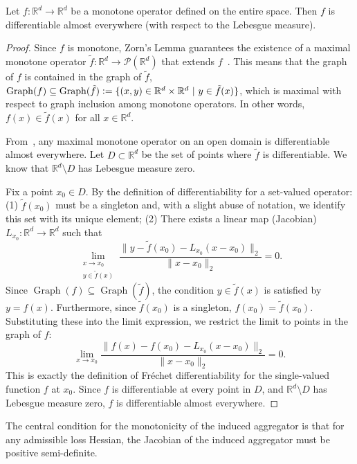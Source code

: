 \documentclass[twoside,11pt]{article}
\newcommand{\R}{\mathbb{R}}
\begin{document}
\begin{theorem}\label{lem:monotone-differentiable}
    Let $f: \mathbb{R}^d \to \mathbb{R}^d$ be a monotone operator defined on the entire space. 
    Then $f$ is differentiable almost everywhere (with respect to the Lebesgue measure).
\end{theorem}
\begin{proof}
    Since $f$ is monotone, Zorn's Lemma guarantees the existence of a maximal monotone operator $\tilde{f}: \mathbb{R}^d \to \mathcal{P}(\mathbb{R}^d)$ that extends $f$~\citep[Theorem 20.21]{Bauschke2011ConvexAA}. 
    This means that the graph of $f$ is contained in the graph of $\tilde{f}$, $\operatorname{Graph}(f) \subseteq \operatorname{Graph}(\tilde{f}) \vcentcolon= \{(x,y) \in \mathbb{R}^d \times \mathbb{R}^d\ |\ y \in \tilde f(x)\}$, which is maximal with respect to graph inclusion among monotone operators.
    In other words, $f(x) \in \tilde{f}(x)$ for all $x\in\R^d$.

    From~\citet[Theorem 3.2]{albamb96}, any maximal monotone operator on an open domain is differentiable almost everywhere. 
    Let $D \subset \mathbb{R}^d$ be the set of points where $\tilde{f}$ is differentiable. 
    We know that $\mathbb{R}^d \setminus D$ has Lebesgue measure zero.

    Fix a point $x_0 \in D$. By the definition of differentiability for a set-valued operator:
    (1) $\tilde{f}(x_0)$ must be a singleton and, with a slight abuse of notation, we identify this set with its unique element;
    (2) There exists a linear map (Jacobian) $L_{x_0}: \mathbb{R}^d \to \mathbb{R}^d$ such that
    \[
        \lim_{\substack{x \to x_0 \\ y \in \tilde{f}(x)}} \frac{\| y - \tilde{f}(x_0) - L_{x_0}(x - x_0) \|_2}{\| x - x_0 \|_2} = 0.
    \]
    Since $\operatorname{Graph}(f) \subseteq \operatorname{Graph}(\tilde{f})$, the condition $y \in \tilde{f}(x)$ is satisfied by $y = f(x)$. 
    Furthermore, since $\tilde{f}(x_0)$ is a singleton, $f(x_0) = \tilde{f}(x_0)$.
    Substituting these into the limit expression, we restrict the limit to points in the graph of $f$:
    \[
        \lim_{x \to x_0} \frac{\| f(x) - f(x_0) - L_{x_0}(x - x_0) \|_2}{\| x - x_0 \|_2} = 0.
    \]
    This is exactly the definition of Fréchet differentiability for the single-valued function $f$ at $x_0$.
    Since $f$ is differentiable at every point in $D$, and $\mathbb{R}^d \setminus D$ has Lebesgue measure zero, $f$ is differentiable almost everywhere.
\end{proof}
The central condition for the monotonicity of the induced aggregator is that for any admissible loss Hessian, the Jacobian of the induced aggregator must be positive semi-definite. 
\end{document}
